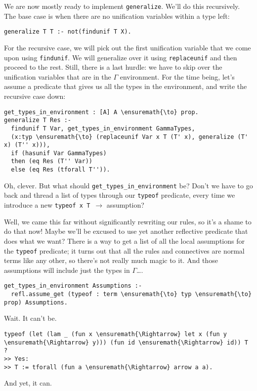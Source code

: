 We are now mostly ready to implement \texttt{generalize}. We'll do this
recursively. The base case is when there are no unification variables
within a type left:

\begin{verbatim}
generalize T T :- not(findunif T X).
\end{verbatim}

For the recursive case, we will pick out the first unification variable
that we come upon using \texttt{findunif}. We will generalize over it
using \texttt{replaceunif} and then proceed to the rest. Still, there is
a last hurdle: we have to skip over the unification variables that are
in the \(\Gamma\) environment. For the time being, let's assume a
predicate that gives us all the types in the environment, and write the
recursive case down:

\begin{verbatim}
get_types_in_environment : [A] A \ensuremath{\to} prop.
generalize T Res :-
  findunif T Var, get_types_in_environment GammaTypes,
  (x:typ \ensuremath{\to} (replaceunif Var x T (T' x), generalize (T' x) (T'' x))),
  if (hasunif Var GammaTypes)
  then (eq Res (T'' Var))
  else (eq Res (tforall T'')).
\end{verbatim}

\identDialog

\heroSTUDENT{} Oh, clever. But what should
\texttt{get\_types\_in\_environment} be? Don't we have to go back and
thread a list of types through our \texttt{typeof} predicate, every time
we introduce a new \texttt{typeof\ x\ T\ \ensuremath{\to}} assumption?

\heroADVISOR{} Well, we came this far without significantly rewriting our
rules, so it's a shame to do that now! Maybe we'll be excused to use yet
another reflective predicate that does what we want? There is a way to
get a list of all the local assumptions for the \texttt{typeof}
predicate; it turns out that all the rules and connectives are normal
\lamprolog terms like any other, so there's not really much magic to it.
And those assumptions will include just the types in \(\Gamma\)\ldots{}.

\begin{verbatim}
get_types_in_environment Assumptions :-
  refl.assume_get (typeof : term \ensuremath{\to} typ \ensuremath{\to} prop) Assumptions.
\end{verbatim}

\heroSTUDENT{} Wait. It can't be.

\begin{verbatim}
typeof (let (lam _ (fun x \ensuremath{\Rightarrow} let x (fun y \ensuremath{\Rightarrow} y))) (fun id \ensuremath{\Rightarrow} id)) T ?
>> Yes:
>> T := tforall (fun a \ensuremath{\Rightarrow} arrow a a).
\end{verbatim}

\heroADVISOR{} And yet, it can.
